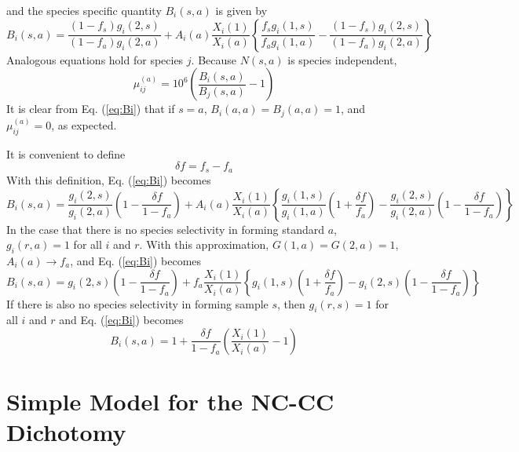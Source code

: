 \documentclass[preprint]{revtex4-2}
\begin{document}
and the species specific quantity $B_i(s, a)$ is given by
\begin{equation}
B_i(s, a) = 
\frac{(1 - f_s) g_i(2, s)}{(1 - f_a) g_i(2, a)}
+
A_i(a) \frac{X_i(1)}{X_i(a)}
\left\{
\frac{f_s g_i(1, s)}{f_a g_i(1, a)}
- \frac{\left(1 - f_s\right) g_i(2, s)}{\left(1 - f_a\right) g_i(2, a)}\right\}
\label{eq:Bi}
\end{equation}
Analogous equations hold for species $j$.
Because $N(s, a)$ is species independent,
\begin{equation}
\mu_{ij}^{(a)} = 10^6 \left(\frac{B_i(s, a)}{B_j(s, a)} - 1\right)
\label{eq:mu_ij_derived}
\end{equation}
It is clear from Eq. (\ref{eq:Bi}) that if $s = a$, $B_i(a, a) = B_j(a, a) = 1$,
and $\mu_{ij}^{(a)} = 0$, as expected.

It is convenient to define
\begin{equation}
\delta f = f_s - f_a
\label{eq:deltaf}
\end{equation}
With this definition, Eq. (\ref{eq:Bi}) becomes
\begin{equation}
B_i(s, a) = 
\frac{g_i(2, s)}{g_i(2, a)}\left(1 - \frac{\delta f}{1 - f_a}\right)
+
A_i(a)\frac{X_i(1)}{X_i(a)}
\left\{
\frac{g_i(1, s)}{g_i(1, a)}\left(1 + \frac{\delta f}{f_a}\right)
- \frac{g_i(2, s)}{g_i(2, a)}\left(1 - \frac{\delta f}{1 - f_a}\right)\right\}
\label{eq:Bi2}
\end{equation}
In the case that there is no species selectivity in forming standard $a$,
$g_i(r, a) = 1$ for all $i$ and $r$.  With this approximation,
$G(1, a) = G(2, a) = 1$, $A_i(a) \to f_a$, and
Eq. (\ref{eq:Bi}) becomes
\begin{equation}
B_i(s, a) = 
g_i(2, s)\left(1 - \frac{\delta f}{1 - f_a}\right)
+
f_a \frac{X_i(1)}{X_i(a)}
\left\{
g_i(1, s)\left(1 + \frac{\delta f}{f_a}\right)
- g_i(2, s)\left(1 - \frac{\delta f}{1 - f_a}\right)\right\}
\label{eq:Bi3}
\end{equation}
If there is also no species selectivity in forming sample $s$, then
$g_i(r, s) = 1$ for all $i$ and $r$ and
Eq. (\ref{eq:Bi}) becomes
\begin{equation}
B_i(s, a) = 1 + \frac{\delta f}{1 - f_a} \left(\frac{X_i(1)}{X_i(a)} - 1\right)
\label{eq:Bi4}
\end{equation}

\section{Simple Model for the NC-CC Dichotomy}
\end{document}
